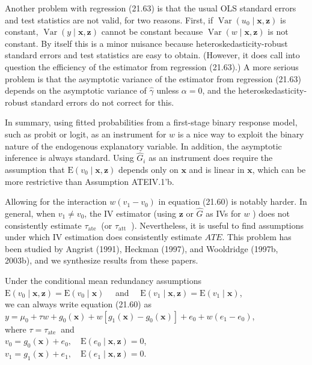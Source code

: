 \documentclass[10pt]{article}
\begin{document}
Another problem with regression (21.63) is that the usual OLS standard errors and test statistics are not valid, for two reasons. First, if $\operatorname{Var}\left(u_{0} \mid \mathbf{x}, \mathbf{z}\right)$ is constant, $\operatorname{Var}(y \mid \mathbf{x}, \mathbf{z})$ cannot be constant because $\operatorname{Var}(w \mid \mathbf{x}, \mathbf{z})$ is not constant. By itself this is a minor nuisance because heteroskedasticity-robust standard errors and test statistics are easy to obtain. (However, it does call into question the efficiency of the estimator from regression (21.63).) A more serious problem is that the asymptotic variance of the estimator from regression (21.63) depends on the asymptotic variance of $\hat{\gamma}$ unless $\alpha=0$, and the heteroskedasticity-robust standard errors do not correct for this.

In summary, using fitted probabilities from a first-stage binary response model, such as probit or logit, as an instrument for $w$ is a nice way to exploit the binary nature of the endogenous explanatory variable. In addition, the asymptotic inference is always standard. Using $\hat{G}_{i}$ as an instrument does require the assumption that $\mathrm{E}\left(v_{0} \mid \mathbf{x}, \mathbf{z}\right)$ depends only on $\mathbf{x}$ and is linear in $\mathbf{x}$, which can be more restrictive than Assumption ATEIV.1'b.

Allowing for the interaction $w\left(v_{1}-v_{0}\right)$ in equation (21.60) is notably harder. In general, when $v_{1} \neq v_{0}$, the IV estimator (using $\mathbf{z}$ or $\hat{G}$ as IVs for $w$ ) does not consistently estimate $\tau_{\text {ate }}$ (or $\tau_{\text {att }}$ ). Nevertheless, it is useful to find assumptions under which IV estimation does consistently estimate $A T E$. This problem has been studied by Angrist (1991), Heckman (1997), and Wooldridge (1997b, 2003b), and we synthesize results from these papers.

Under the conditional mean redundancy assumptions\\
$\mathrm{E}\left(v_{0} \mid \mathbf{x}, \mathbf{z}\right)=\mathrm{E}\left(v_{0} \mid \mathbf{x}\right) \quad$ and $\quad \mathrm{E}\left(v_{1} \mid \mathbf{x}, \mathbf{z}\right)=\mathrm{E}\left(v_{1} \mid \mathbf{x}\right)$,\\
we can always write equation (21.60) as\\
$y=\mu_{0}+\tau w+g_{0}(\mathbf{x})+w\left[g_{1}(\mathbf{x})-g_{0}(\mathbf{x})\right]+e_{0}+w\left(e_{1}-e_{0}\right)$,\\
where $\tau=\tau_{\text {ate }}$ and\\
$v_{0}=g_{0}(\mathbf{x})+e_{0}, \quad \mathrm{E}\left(e_{0} \mid \mathbf{x}, \mathbf{z}\right)=0$,\\
$v_{1}=g_{1}(\mathbf{x})+e_{1}, \quad \mathrm{E}\left(e_{1} \mid \mathbf{x}, \mathbf{z}\right)=0$.
\end{document}

